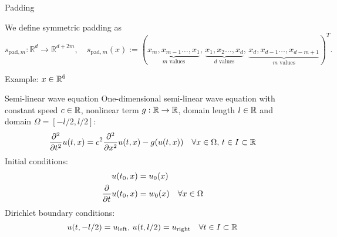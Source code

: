 \begin{frame}{Padding}
    \begin{definition}
        We define symmetric padding as
        \begin{equation*}
        s_{\text{pad},m} : \mathbb{R}^d \to \mathbb{R}^{d+2m},
        \quad s_{\text{pad},m}(x) := (
            \underbrace{x_m, x_{m-1} \dots, x_1}_{m \text{ values}}, \,
            \underbrace{x_1, x_2 \dots, x_d}_{d \text{ values}}, \,
            \underbrace{x_d, x_{d-1} \dots, x_{d-m+1}}_{m \text{ values}}
        )^T
        .
        \end{equation*}
    \end{definition}

    \vspace{0.3cm}
    Example:
    $x \in \mathbb{R}^6$

    \vspace{0.3cm}
    \centering
\end{frame}

\begin{frame}{Semi-linear wave equation}
    One-dimensional semi-linear wave equation with constant speed $c \in \mathbb{R}$, nonlinear term 
    $g : \mathbb{R} \to \mathbb{R}$, domain length $l \in \mathbb{R}$ and domain $\Omega = [-l/2, l/2]$:
    \begin{equation*}
        \frac{\partial^2}{\partial t^2} u(t,x) = 
        c^2 \frac{\partial^2}{\partial x^2} u(t,x) - g(u(t,x)) 
        \quad \forall x \in \Omega, 
        \, t \in I \subset \mathbb{R}
    \end{equation*}
    Initial conditions:
    \begin{align*}
        u(t_0,x) &= u_0(x) \\
        \frac{\partial }{\partial t} u(t_0,x) &= w_0(x) \quad \forall x \in \Omega
    \end{align*}
    Dirichlet boundary conditions:
    \begin{equation*}
        u(t,-l/2) = u_{\text{left}}, \, u(t,l/2) = u_{\text{right}} \quad \forall t \in I \subset \mathbb{R}
    \end{equation*}
\end{frame}

